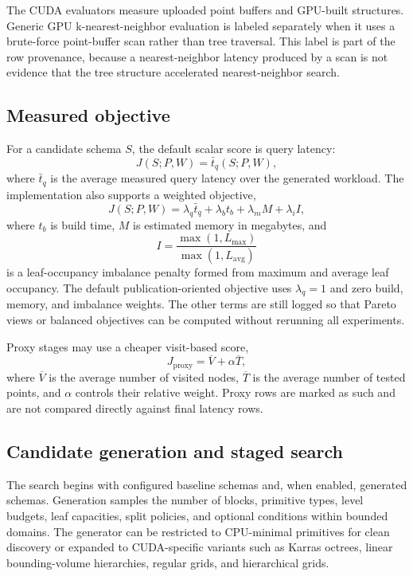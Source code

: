 The CUDA evaluators measure uploaded point buffers and GPU-built structures. Generic GPU k-nearest-neighbor evaluation is labeled separately when it uses a brute-force point-buffer scan rather than tree traversal. This label is part of the row provenance, because a nearest-neighbor latency produced by a scan is not evidence that the tree structure accelerated nearest-neighbor search.

\subsection{Measured objective}

For a candidate schema $S$, the default scalar score is query latency:
\begin{equation}
J(S;P,W) = \bar{t}_q(S;P,W),
\end{equation}
where $\bar{t}_q$ is the average measured query latency over the generated workload. The implementation also supports a weighted objective,
\begin{equation}
J(S;P,W) =
\lambda_q \bar{t}_q +
\lambda_b t_b +
\lambda_m M +
\lambda_i I,
\end{equation}
where $t_b$ is build time, $M$ is estimated memory in megabytes, and
\begin{equation}
I = \frac{\max(1, L_{\max})}{\max(1, L_{\mathrm{avg}})}
\end{equation}
is a leaf-occupancy imbalance penalty formed from maximum and average leaf occupancy. The default publication-oriented objective uses $\lambda_q=1$ and zero build, memory, and imbalance weights. The other terms are still logged so that Pareto views or balanced objectives can be computed without rerunning all experiments.

Proxy stages may use a cheaper visit-based score,
\begin{equation}
J_{\mathrm{proxy}} = \overline{V} + \alpha \overline{T},
\end{equation}
where $\overline{V}$ is the average number of visited nodes, $\overline{T}$ is the average number of tested points, and $\alpha$ controls their relative weight. Proxy rows are marked as such and are not compared directly against final latency rows.

\subsection{Candidate generation and staged search}

The search begins with configured baseline schemas and, when enabled, generated schemas. Generation samples the number of blocks, primitive types, level budgets, leaf capacities, split policies, and optional conditions within bounded domains. The generator can be restricted to CPU-minimal primitives for clean discovery or expanded to CUDA-specific variants such as Karras octrees, linear bounding-volume hierarchies, regular grids, and hierarchical grids.

